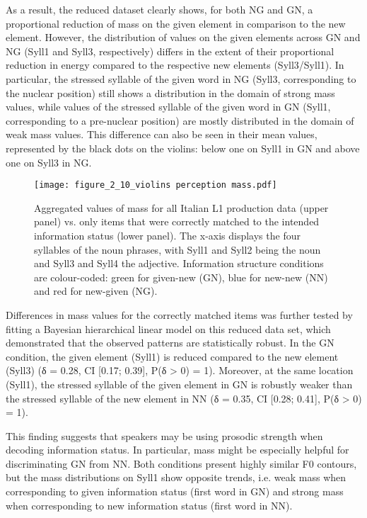 As a result, the reduced dataset clearly shows, for both NG and GN, a proportional reduction of mass on the given element in comparison to the new element. However, the distribution of values on the given elements across GN and NG (Syll1 and Syll3, respectively) differs in the extent of their proportional reduction in energy compared to the respective new elements (Syll3/Syll1). In particular, the stressed syllable of the given word in NG (Syll3, corresponding to the nuclear position) still shows a distribution in the domain of strong mass values, while values of the stressed syllable of the given word in GN (Syll1, corresponding to a pre-nuclear position) are mostly distributed in the domain of weak mass values. This difference can also be seen in their mean values, represented by the black dots on the violins: below one on Syll1 in GN and above one on Syll3 in NG.

  

 

\begin{figure}
\texttt{[image: figure\_2\_10\_violins perception mass.pdf]}
\caption{Aggregated values of mass for all Italian L1 production data (upper panel) vs. only items that were correctly matched to the intended information status (lower panel). The x-axis displays the four syllables of the noun phrases, with Syll1 and Syll2 being the noun and Syll3 and Syll4 the adjective. Information structure conditions are colour-coded: green for given-new (GN), blue for new-new (NN) and red for new-given (NG).}
\label{fig:2.10}
\end{figure}

Differences in mass values for the correctly matched items was further tested by fitting a Bayesian hierarchical linear model on this reduced data set, which demonstrated that the observed patterns are statistically robust. In the GN condition, the given element (Syll1) is reduced compared to the new element (Syll3) (δ = 0.28, CI [0.17; 0.39], P(δ > 0) = 1). Moreover, at the same location (Syll1), the stressed syllable of the given element in GN is robustly weaker than the stressed syllable of the new element in NN (δ = 0.35, CI [0.28; 0.41], P(δ > 0) = 1).

This finding suggests that speakers may be using prosodic strength when decoding information status. In particular, mass might be especially helpful for discriminating GN from NN. Both conditions present highly similar F0 contours, but the mass distributions on Syll1 show opposite trends, i.e. weak mass when corresponding to given information status (first word in GN) and strong mass when corresponding to new information status (first word in NN). 

